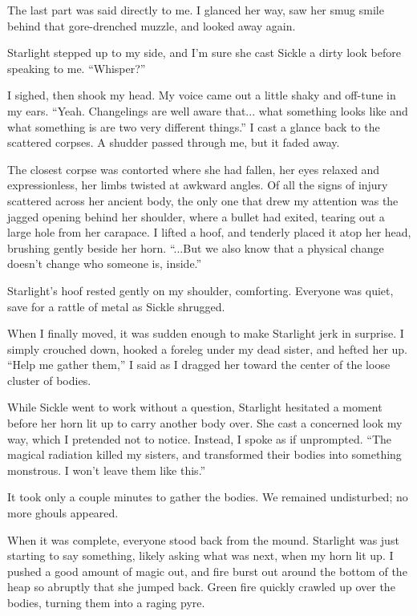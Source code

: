 The last part was said directly to me. I glanced her way, saw her smug smile behind that gore-drenched muzzle, and looked away again.

Starlight stepped up to my side, and I’m sure she cast Sickle a dirty look before speaking to me. “Whisper?”

I sighed, then shook my head. My voice came out a little shaky and off-tune in my ears. “Yeah. Changelings are well aware that... what something looks like and what something is are two very different things.” I cast a glance back to the scattered corpses. A shudder passed through me, but it faded away.

The closest corpse was contorted where she had fallen, her eyes relaxed and expressionless, her limbs twisted at awkward angles. Of all the signs of injury scattered across her ancient body, the only one that drew my attention was the jagged opening behind her shoulder, where a bullet had exited, tearing out a large hole from her carapace. I lifted a hoof, and tenderly placed it atop her head, brushing gently beside her horn. “...But we also know that a physical change doesn’t change who someone is, inside.”

Starlight’s hoof rested gently on my shoulder, comforting. Everyone was quiet, save for a rattle of metal as Sickle shrugged.

When I finally moved, it was sudden enough to make Starlight jerk in surprise. I simply crouched down, hooked a foreleg under my dead sister, and hefted her up. “Help me gather them,” I said as I dragged her toward the center of the loose cluster of bodies.

While Sickle went to work without a question, Starlight hesitated a moment before her horn lit up to carry another body over. She cast a concerned look my way, which I pretended not to notice. Instead, I spoke as if unprompted. “The magical radiation killed my sisters, and transformed their bodies into something monstrous. I won’t leave them like this.”

It took only a couple minutes to gather the bodies. We remained undisturbed; no more ghouls appeared.

When it was complete, everyone stood back from the mound. Starlight was just starting to say something, likely asking what was next, when my horn lit up. I pushed a good amount of magic out, and fire burst out around the bottom of the heap so abruptly that she jumped back. Green fire quickly crawled up over the bodies, turning them into a raging pyre.

